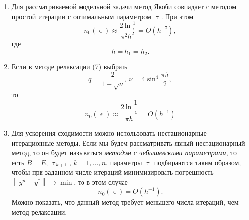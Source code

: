 \documentclass[a4paper, 12pt]{report}
\numberwithin{equation}{section}
\renewcommand{\tau}{\uptau}
\renewcommand{\epsilon}{\upvarepsilon}
\newcommand\Norm[1]{\left\| #1 \right\|}
\begin{document}
	\begin{enumerate}
		\item Для рассматриваемой модельной задачи метод Якоби совпадает с методом простой итерации с оптимальным параметром $\tau$. При этом $$n_0(\epsilon)\approx \dfrac{2 \ln \frac 1 \epsilon}{\pi ^2 h^2} = O(h^{-2}),$$
		где $$h = h_1 =h_2.$$
		\item Если в методе релаксации (7) выбрать $$q = \dfrac {2}{1 + \sqrt \nu},\ \nu = 4 \sin ^4 \dfrac{\pi h}{2},$$
		то
		$$n_0 (\epsilon)\approx  \dfrac{2 \ln \dfrac 1 \epsilon}{\pi h} = O(h^{-1})$$
		\item Для ускорения сходимости можно использовать нестационарные итерационные методы. Если мы будем рассматривать явный нестационарный метод, то он будет называться \textit{методом с чебышевскими параметрами}, то есть $B = E$, $\tau_{k+1}$, $k = 1,\ldots, n$, параметры $\tau$ подбираются таким образом, чтобы при заданном числе итераций минимизировать погрешность $\Norm{y^n - y^*} \to \min$, то в этом случае $$n_0(\epsilon) = O(h^{-1}).$$
		Можно показать, что данный метод требует меньшего числа итераций, чем метод релаксации.
	\end{enumerate}
\end{document}
